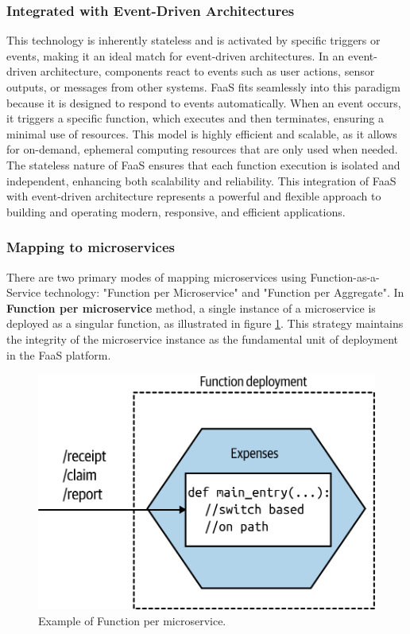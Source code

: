 \subsubsection{Integrated with Event-Driven Architectures}
This technology is inherently stateless and is activated by specific triggers or events, making it
an ideal match for event-driven architectures. In an event-driven architecture, components react to
events such as user actions, sensor outputs, or messages from other systems. FaaS fits seamlessly
into this paradigm because it is designed to respond to events automatically. When an event occurs,
it triggers a specific function, which executes and then terminates, ensuring a minimal use of
resources. This model is highly efficient and scalable, as it allows for on-demand, ephemeral
computing resources that are only used when needed. The stateless nature of FaaS ensures that each
function execution is isolated and independent, enhancing both scalability and reliability. This
integration of FaaS with event-driven architecture represents a powerful and flexible approach to
building and operating modern, responsive, and efficient applications.

\subsubsection{Mapping to microservices}
There are two primary modes of mapping microservices using Function-as-a-Service technology:
"Function per Microservice" and "Function per Aggregate".
\newline\newline
In \textbf{Function per microservice} method, a single instance of a microservice is deployed as a
singular function, as illustrated in figure \ref{fig:3_single_function}. This strategy maintains the
integrity of the microservice instance as the fundamental unit of deployment in the FaaS platform.

\begin{figure}
    \centering
    \includegraphics[scale=0.5]{Pictures/3_single_function.png}
    \caption{Example of Function per microservice.}
    \label{fig:3_single_function}
\end{figure}

